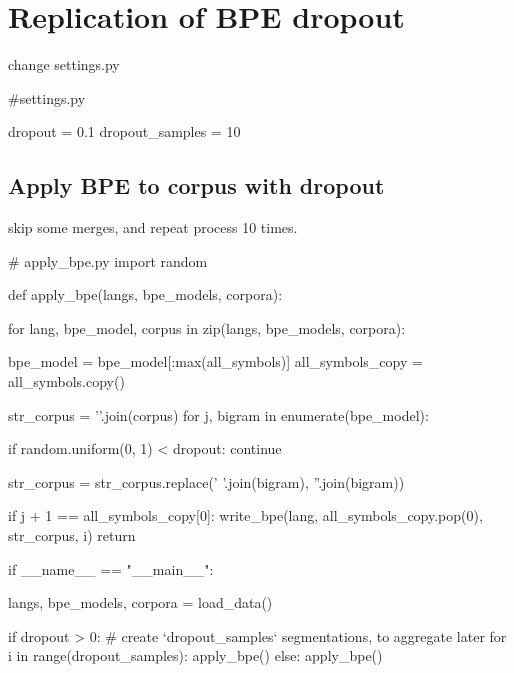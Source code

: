 \section{Replication of BPE dropout}

change settings.py

\begin{python}
#settings.py

dropout = 0.1
dropout_samples = 10
\end{python}

\subsection{Apply BPE to corpus with dropout}

skip some merges, and repeat process 10 times.

\begin{python}
# apply_bpe.py
import random

def apply_bpe(langs, bpe_models, corpora):
    
  for lang, bpe_model, corpus in zip(langs, bpe_models, corpora):

    bpe_model = bpe_model[:max(all_symbols)]
    all_symbols_copy = all_symbols.copy()

    str_corpus = '\n'.join(corpus)
    for j, bigram in enumerate(bpe_model):

        if random.uniform(0, 1) < dropout:
            continue

      str_corpus = str_corpus.replace(' '.join(bigram), ''.join(bigram))

      if j + 1 == all_symbols_copy[0]:
        write_bpe(lang, all_symbols_copy.pop(0), str_corpus, i)
  return

if __name__ == "__main__":

  langs, bpe_models, corpora = load_data()

  if dropout > 0:
    # create `dropout_samples` segmentations, to aggregate later
    for i in range(dropout_samples):
      apply_bpe()
  else:
      apply_bpe()
\end{python}


\begin{python}

\end{python}
